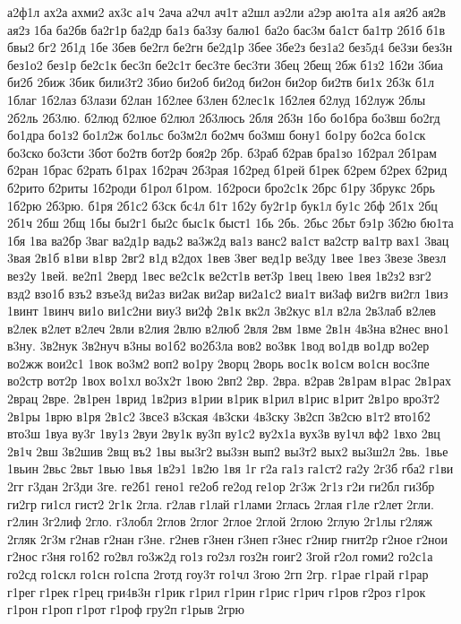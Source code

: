 {а2ф1л
ах2а
ахми2
ах3с
а1ч
2ача
а2чл
ач1т
а2шл
аэ2ли
а2эр
аю1та
а1я
ая2б
ая2в
ая2з
1ба
ба2бв
ба2г1р
ба2др
ба1з
ба3зу
балю1
ба2о
бас3м
ба1ст
ба1тр
2б1б
б1в
бвы2
бг2
2б1д
1бе
3бев
бе2гл
бе2гн
бе2д1р
3бее
3бе2з
без1а2
без5д4
бе3зи
без3н
без1о2
без1р
бе2с1к
бес3п
бе2с1т
бес3те
бес3ти
3бец
2бещ
2бж
б1з2
1б2и
3биа
би2б
2биж
3бик
били3т2
3био
би2об
би2од
би2он
би2ор
би2тв
би1х
2б3к
б1л
1благ
1б2лаз
б3лази
б2лан
1б2лее
б3лен
б2лес1к
1б2лея
б2луд
1б2луж
2блы
2б2ль
2б3лю.
б2люд
б2люе
б2люл
2б3люсь
2бля
2б3н
1бо
бо1бра
бо3вш
бо2гд
бо1дра
бо1з2
бо1л2ж
бо1льс
бо3м2л
бо2мч
бо3мш
бону1
бо1ру
бо2са
бо1ск
бо3ско
бо3сти
3бот
бо2тв
бот2р
боя2р
2бр.
б3раб
б2рав
бра1зо
1б2рал
2б1рам
б2ран
1брас
б2рать
б1рах
1б2рач
2б3рая
1б2ред
б1рей
б1рек
б2рем
б2рех
б2рид
б2рито
б2риты
1б2роди
б1рол
б1ром.
1б2роси
бро2с1к
2брс
б1ру
3брукс
2брь
1б2рю
2б3рю.
б1ря
2б1с2
б3ск
бс4л
б1т
1б2у
бу2г1р
бук1л
бу1с
2бф
2б1х
2бц
2б1ч
2бш
2бщ
1бы
бы2г1
бы2с
быс1к
быст1
1бь
2бь.
2бьс
2бьт
бэ1р
3б2ю
бю1та
1бя
1ва
ва2бр
3ваг
ва2д1р
вадь2
ва3ж2д
ва1з
ванс2
ва1ст
ва2стр
ва1тр
вах1
3вац
3вая
2в1б
в1ви
в1вр
2вг2
в1д
в2дох
1вев
3вег
вед1р
ве3ду
1вее
1вез
3везе
3везл
вез2у
1вей.
ве2п1
2верд
1вес
ве2с1к
ве2ст1в
вет3р
1вец
1вею
1вея
1в2з2
взг2
взд2
взо1б
взъ2
взъе3д
ви2аз
ви2ак
ви2ар
ви2а1с2
виа1т
ви3аф
ви2гв
ви2гл
1виз
1винт
1винч
ви1о
ви1с2ни
виу3
ви2ф
2в1к
вк2л
3в2кус
в1л
в2ла
2в3лаб
в2лев
в2лек
в2лет
в2леч
2вли
в2лия
2влю
в2люб
2вля
2вм
1вме
2в1н
4в3на
в2нес
вно1
в3ну.
3в2нук
3в2нуч
в3ны
во1б2
во2б3ла
вов2
во3вк
1вод
во1дв
во1др
во2ер
во2жж
вои2с1
1вок
во3м2
воп2
во1ру
2ворц
2ворь
вос1к
во1см
во1сн
вос3пе
во2стр
вот2р
1вох
во1хл
во3х2т
1вою
2вп2
2вр.
2вра.
в2рав
2в1рам
в1рас
2в1рах
2врац
2вре.
2в1рен
1врид
1в2риз
в1рии
в1рик
в1рил
в1рис
в1рит
2в1ро
вро3т2
2в1ры
1врю
в1ря
2в1с2
3все3
в3ская
4в3ски
4в3ску
3в2сп
3в2сю
в1т2
вто1б2
вто3ш
1вуа
ву3г
1ву1з
2вуи
2ву1к
ву3п
ву1с2
ву2х1а
вух3в
ву1чл
вф2
1вхо
2вц
2в1ч
2вш
3в2шив
2вщ
въ2
1вы
вы3г2
вы3зн
вып2
вы3т2
вых2
вы3ш2л
2вь.
1вье
1вьин
2вьс
2вьт
1вью
1вья
1в2э1
1в2ю
1вя
1г
г2а
га1з
га1ст2
га2у
2г3б
гба2
г1ви
2гг
г3дан
2г3ди
3ге.
ге2б1
гено1
ге2об
ге2од
ге1ор
2г3ж
2г1з
г2и
ги2бл
ги3бр
ги2гр
ги1сл
гист2
2г1к
2гла.
г2лав
г1лай
г1лами
2глась
2глая
г1ле
г2лет
2гли.
г2лин
3г2лиф
2гло.
г3лобл
2глов
2глог
2глое
2глой
2глою
2глую
2г1лы
г2ляж
2гляк
2г3м
г2нав
г2нан
г3не.
г2нев
г3нен
г3неп
г3нес
г2нир
гнит2р
г2ное
г2нои
г2нос
г3ня
го1б2
го2вл
го3ж2д
го1з
го2зл
гоз2н
гоиг2
3гой
г2ол
гоми2
го2с1а
го2сд
го1скл
го1сн
го1спа
2готд
гоу3т
го1чл
3гою
2гп
2гр.
г1рае
г1рай
г1рар
г1рег
г1рек
г1рец
гри4в3н
г1рик
г1рил
г1рин
г1рис
г1рич
г1ров
г2роз
г1рок
г1рон
г1роп
г1рот
г1роф
гру2п
г1рыв
2грю
}
